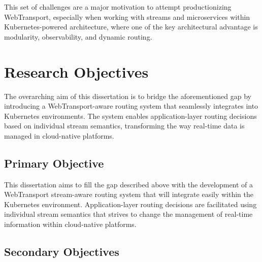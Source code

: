 This set of challenges are a major motivation to attempt productionizing WebTransport, especially when working with streams and microservices within Kubernetes-powered architecture, where one of the key architectural advantage is modularity, observability, and dynamic routing.

\section{Research Objectives}

The overarching aim of this dissertation is to bridge the aforementioned gap by introducing a WebTransport-aware routing system that seamlessly integrates into Kubernetes environments. The system enables application-layer routing decisions based on individual stream semantics, transforming the way real-time data is managed in cloud-native platforms.

\subsection{Primary Objective}

This dissertation aims to fill the gap described above with the development of a WebTransport stream-aware routing system that will integrate easily within the Kubernetes environment. Application-layer routing decisions are facilitated using individual stream semantics that strives to change the management of real-time information within cloud-native platforms.

\subsection{Secondary Objectives}

